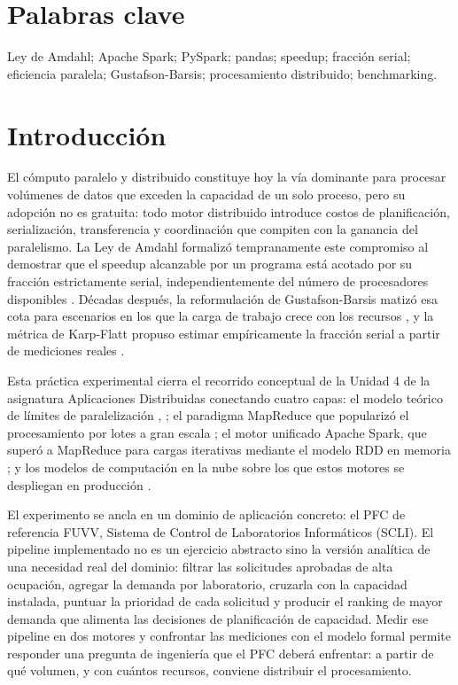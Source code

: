 \documentclass[10pt,journal]{IEEEtran}
\begin{document}
\section*{Palabras clave}
Ley de Amdahl; Apache Spark; PySpark; pandas; speedup; fracci\'on serial;
eficiencia paralela; Gustafson-Barsis; procesamiento distribuido; benchmarking.

\section{Introducci\'on}
El c\'omputo paralelo y distribuido constituye hoy la v\'ia dominante para
procesar vol\'umenes de datos que exceden la capacidad de un solo proceso, pero
su adopci\'on no es gratuita: todo motor distribuido introduce costos de
planificaci\'on, serializaci\'on, transferencia y coordinaci\'on que compiten con
la ganancia del paralelismo. La Ley de Amdahl formaliz\'o tempranamente este
compromiso al demostrar que el speedup alcanzable por un programa est\'a acotado
por su fracci\'on estrictamente serial, independientemente del n\'umero de
procesadores disponibles \cite{amdahl1967}. D\'ecadas despu\'es, la reformulaci\'on
de Gustafson-Barsis matiz\'o esa cota para escenarios en los que la carga de
trabajo crece con los recursos \cite{gustafson1988}, y la m\'etrica de Karp-Flatt
propuso estimar emp\'iricamente la fracci\'on serial a partir de mediciones
reales \cite{karp1990}.

Esta pr\'actica experimental cierra el recorrido conceptual de la Unidad 4 de la
asignatura Aplicaciones Distribuidas conectando cuatro capas: el modelo te\'orico
de l\'imites de paralelizaci\'on \cite{amdahl1967}, \cite{gustafson1988}; el
paradigma MapReduce que populariz\'o el procesamiento por lotes a gran escala
\cite{dean2008}; el motor unificado Apache Spark, que super\'o a MapReduce para
cargas iterativas mediante el modelo RDD en memoria \cite{zaharia2016}; y los modelos de computaci\'on en la nube sobre los que estos
motores se despliegan en producci\'on \cite{mell2011}.

El experimento se ancla en un dominio de aplicaci\'on concreto: el PFC de
referencia FUVV, Sistema de Control de Laboratorios Inform\'aticos (SCLI). El pipeline implementado no es un ejercicio abstracto sino la
versi\'on anal\'itica de una necesidad real del dominio: filtrar las
solicitudes aprobadas de alta ocupaci\'on, agregar la demanda por laboratorio,
cruzarla con la capacidad instalada, puntuar la prioridad de cada solicitud y
producir el ranking de mayor demanda que alimenta las decisiones de
planificaci\'on de capacidad. Medir ese pipeline en dos motores y confrontar
las mediciones con el modelo formal permite responder una pregunta de
ingenier\'ia que el PFC deber\'a enfrentar: a partir de qu\'e volumen, y con
cu\'antos recursos, conviene distribuir el procesamiento.
\end{document}
